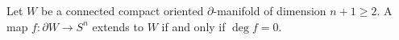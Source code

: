 Let $W$ be a connected compact oriented $\partial$-manifold of dimension $n + 1 \geqslant 2$. A map $f: \partial W \to S^n$ extends to $W$ if and only if $\deg f = 0$.
